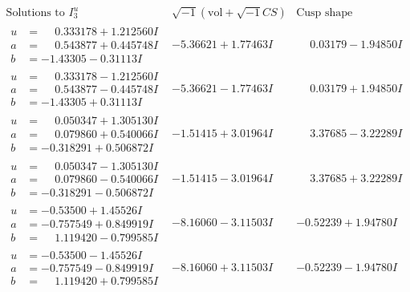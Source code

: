\documentclass[1p]{elsarticle_modified}
\theoremstyle{definition}
\newcommand{\I}{\sqrt{-1}}
\begin{document}
$$\begin{array}{c|c|c}  
\text{Solutions to }I^u_{3}& \I (\text{vol} + \sqrt{-1}CS) & \text{Cusp shape}\\
 \hline 
\begin{aligned}
u &= \phantom{-}0.333178 + 1.212560 I \\
a &= \phantom{-}0.543877 + 0.445748 I \\
b &= -1.43305 - 0.31113 I\end{aligned}
 & -5.36621 + 1.77463 I & \phantom{-}0.03179 - 1.94850 I \\ \hline\begin{aligned}
u &= \phantom{-}0.333178 - 1.212560 I \\
a &= \phantom{-}0.543877 - 0.445748 I \\
b &= -1.43305 + 0.31113 I\end{aligned}
 & -5.36621 - 1.77463 I & \phantom{-}0.03179 + 1.94850 I \\ \hline\begin{aligned}
u &= \phantom{-}0.050347 + 1.305130 I \\
a &= \phantom{-}0.079860 + 0.540066 I \\
b &= -0.318291 + 0.506872 I\end{aligned}
 & -1.51415 + 3.01964 I & \phantom{-}3.37685 - 3.22289 I \\ \hline\begin{aligned}
u &= \phantom{-}0.050347 - 1.305130 I \\
a &= \phantom{-}0.079860 - 0.540066 I \\
b &= -0.318291 - 0.506872 I\end{aligned}
 & -1.51415 - 3.01964 I & \phantom{-}3.37685 + 3.22289 I \\ \hline\begin{aligned}
u &= -0.53500 + 1.45526 I \\
a &= -0.757549 + 0.849919 I \\
b &= \phantom{-}1.119420 - 0.799585 I\end{aligned}
 & -8.16060 - 3.11503 I & -0.52239 + 1.94780 I \\ \hline\begin{aligned}
u &= -0.53500 - 1.45526 I \\
a &= -0.757549 - 0.849919 I \\
b &= \phantom{-}1.119420 + 0.799585 I\end{aligned}
 & -8.16060 + 3.11503 I & -0.52239 - 1.94780 I \\ \hline\begin{aligned}

\end{aligned}
\end{array}$$
\end{document}
